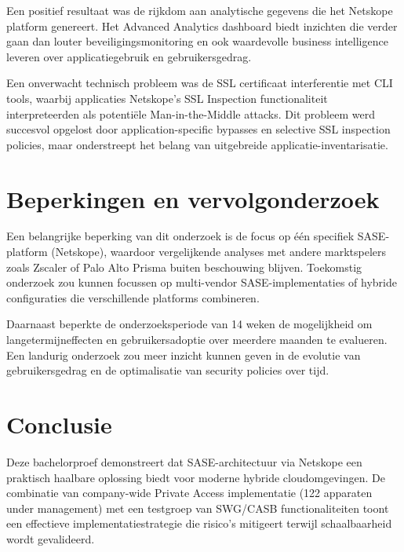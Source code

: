 \vspace{2ex}

Een positief resultaat was de rijkdom aan analytische gegevens die het Netskope platform genereert. Het Advanced Analytics dashboard biedt inzichten die verder gaan dan louter beveiligingsmonitoring en ook waardevolle business intelligence leveren over applicatiegebruik en gebruikersgedrag.

\vspace{2ex}

Een onverwacht technisch probleem was de SSL certificaat interferentie met CLI tools, waarbij applicaties Netskope's SSL Inspection functionaliteit interpreteerden als potentiële Man-in-the-Middle attacks. Dit probleem werd succesvol opgelost door application-specific bypasses en selective SSL inspection policies, maar onderstreept het belang van uitgebreide applicatie-inventarisatie.

\section{Beperkingen en vervolgonderzoek}

Een belangrijke beperking van dit onderzoek is de focus op één specifiek SASE-platform (Netskope), waardoor vergelijkende analyses met andere marktspelers zoals Zscaler of Palo Alto Prisma buiten beschouwing blijven. Toekomstig onderzoek zou kunnen focussen op multi-vendor SASE-implementaties of hybride configuraties die verschillende platforms combineren.

\vspace{2ex}

Daarnaast beperkte de onderzoeksperiode van 14 weken de mogelijkheid om langetermijneffecten en gebruikersadoptie over meerdere maanden te evalueren. Een landurig onderzoek zou meer inzicht kunnen geven in de evolutie van gebruikersgedrag en de optimalisatie van security policies over tijd.

\section{Conclusie}

Deze bachelorproef demonstreert dat SASE-architectuur via Netskope een praktisch haalbare oplossing biedt voor moderne hybride cloudomgevingen. De combinatie van company-wide Private Access implementatie (122 apparaten under management) met een testgroep van SWG/CASB functionaliteiten toont een effectieve implementatiestrategie die risico's mitigeert terwijl schaalbaarheid wordt gevalideerd.

